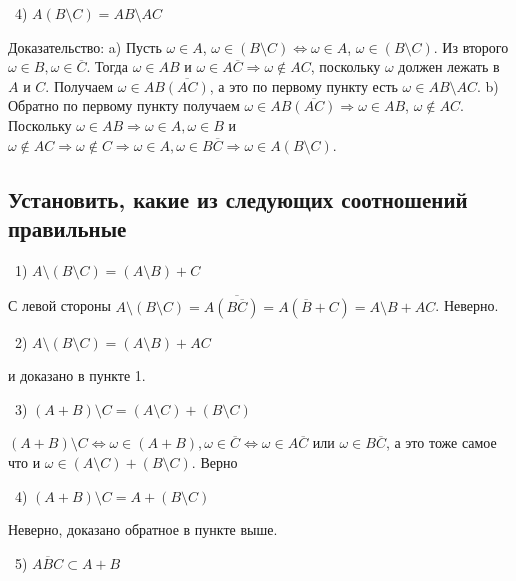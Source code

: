 \medskip
\noindent~4) $A \left( B \setminus C \right) = AB \setminus AC$

\noindent Доказательство: a) Пусть $\omega \in A$, $\omega \in \left( B \setminus C \right) \Leftrightarrow \omega
\in A $, $\omega \in \left( B \setminus C \right) $. Из второго $\omega \in B, \omega \in \overline{C}$.
Тогда $\omega \in AB$ и $\omega \in A\overline{C} \Rightarrow \omega \not\in AC$, поскольку
$\omega$ должен лежать в $A$ и $C$. Получаем $\omega \in AB \overline{\left( AC \right)} $, а это по первому пункту 
есть $\omega \in AB \setminus AC$. b) Обратно по первому пункту получаем $\omega \in AB \overline{\left( AC \right)}
 \Rightarrow \omega \in AB$, $\omega \not\in AC$. Поскольку $\omega \in AB \Rightarrow \omega \in A, 
 \omega \in B$ и $\omega \not\in AC \Rightarrow \omega \not\in C \Rightarrow \omega \in A, \omega
\in B\overline{C} \Rightarrow \omega \in A \left( B \setminus C \right)$. 


\subsection{Установить, какие из следующих соотношений правильные}

\noindent~1) $A \setminus \left( B \setminus C \right) = \left( A \setminus B \right) + C$

\noindent С левой стороны $A \setminus \left( B \setminus C \right) = A \overline{\left( 
B  \overline{C}\right) } = A \left( \overline{B} + C \right) = A \setminus B + A C$. Неверно.

\medskip
\noindent~2) $A \setminus \left( B \setminus C \right) = \left( A \setminus B \right) + AC$

 и доказано в пункте 1.

\medskip
\noindent~3) $\left( A + B \right) \setminus C = \left( A \setminus C \right) + \left( B \setminus C \right) $

\noindent $\left( A + B \right) \setminus C \Leftrightarrow \omega \in \left(A + B\right),
\omega \in \overline{C} \Leftrightarrow \omega \in A\overline{C} $ или $ \omega \in B\overline{C}$, 
а это тоже самое что и $\omega \in \left(A \setminus C\right) + \left(B \setminus C\right)$. Верно

\medskip
\noindent~4) $\left( A + B \right)  \setminus C = A + \left( B \setminus C \right) $

\noindent Неверно, доказано обратное в пункте выше.

\medskip
\noindent~5) $A\overline{B}C \subset A + B$

